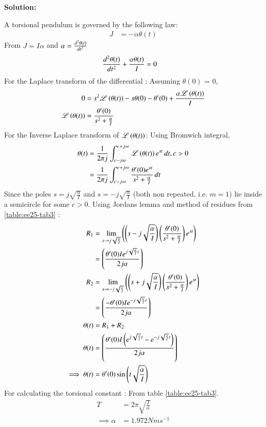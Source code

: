 \documentclass[journal,12pt,onecolumn]{IEEEtran}
\theoremstyle{remark}
\begin{document}
\textbf{Solution:}
    
A torsional pendulum is governed by the following law:
\begin{align}
    J &= -\alpha\theta(t) 
\end{align}
From $J = I\alpha$ and $\alpha = \dv[2]{\theta(t)}{t}$
\begin{align}
\dv[2]{\theta(t)}{t} + \frac{\alpha\theta(t)}{I} &= 0
\end{align}
For the Laplace transform of the differential : 
Assuming $\theta(0)$ = 0,
\begin{align}
0 &= s^2\mathscr{L}\left(\theta(t)\right) - s\theta(0) - \theta'(0) + \frac{\alpha\mathscr{L}\left(\theta(t)\right)}{I}\\
\mathscr{L}\left(\theta(t)\right) &= \frac{\theta'(0)}{s^2+\frac{\alpha}{I}}
    \end{align}
For the Inverse Laplace transform of $\mathscr{L}\left(\theta(t)\right)$: Using Bromwich integral,
\begin{align}
 \theta(t) &= \frac{1}{2\pi j}\int_{c-j\infty}^{c+j\infty}\mathscr{L}\left(\theta(t)\right)e^{st}\,dt , c > 0\\
 &= \frac{1}{2\pi j}\int_{c-j\infty}^{c+j\infty}\frac{\theta'(0)e^{st}}{s^2+\frac{\alpha}{I}}\,dt
\end{align}
Since the poles $s=j\sqrt{\frac{\alpha}{I}}$ and $s=-j\sqrt{\frac{\alpha}{I}}$ (both non repeated, i.e. $m=1$) lie inside a semicircle for some $c>0$. Using Jordans lemma and method of residues from \ref{table:ee25-tab3} :
\begin{align}
      R_1&=\lim\limits_{s\to j\sqrt{\frac{\alpha}{I}}}\left({\left(s-j\sqrt{\frac{\alpha}{I}}\right)}\left(\frac{\theta'(0)}{s^2+\frac{\alpha}{I}}\right) e^{st}\right)\\
&={\left(\frac{\theta'(0)Ie^{j\sqrt{\frac{\alpha}{I}}t}}{2j\alpha}\right)}\\
  R_2&=\lim\limits_{s\to -j\sqrt{\frac{\alpha}{I}}}\left({\left(s+j\sqrt{\frac{\alpha}{I}}\right)}\left(\frac{\theta'(0)}{s^2+\frac{\alpha}{I}}\right) e^{st}\right)\\
&={\left(\frac{-\theta'(0)Ie^{-j\sqrt{\frac{\alpha}{I}}t}}{2j\alpha}\right)}\\
\theta(t) &= R_1 + R_2\\
\theta(t) &= {\left(\frac{\theta'(0)I\left(e^{j\sqrt{\frac{\alpha}{I}}t}-e^{-j\sqrt{\frac{\alpha}{I}}t}\right)}{2j\alpha}\right)}\\
\implies
\theta(t) &=\theta'(0)\sin{\ensuremath{\left(t\sqrt{\frac{\alpha}{I}}\right)}}
\end{align}
For calculating the torsional constant :
From table \ref{table:ee25-tab3}.
\begin{align}
 T &= 2\pi\sqrt{\frac{I}{\alpha}}\\
\implies \alpha &= 1.972 Nms^{-1}
\end{align}
\end{document}
